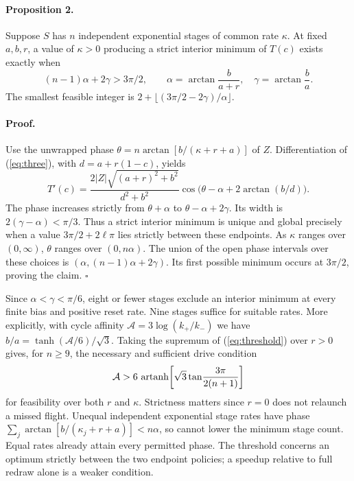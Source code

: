 \documentclass[11pt]{article}
\begin{document}
\paragraph{Proposition 2.}
Suppose $S$ has $n$ independent exponential stages of common rate $\kappa$. At fixed $a,b,r$, a value of $\kappa>0$ producing a strict interior minimum of $T(c)$ exists exactly when
\begin{equation}
 (n-1)\alpha+2\gamma>3\pi/2,\qquad
 \alpha=\arctan\!\frac{b}{a+r},\quad \gamma=\arctan\!\frac{b}{a}. \label{eq:threshold}
\end{equation}
The smallest feasible integer is $2+\lfloor(3\pi/2-2\gamma)/\alpha\rfloor$.

\paragraph{Proof.}
Use the unwrapped phase $\theta=n\arctan[b/(\kappa+r+a)]$ of $Z$. Differentiation of (\ref{eq:three}), with $d=a+r(1-c)$, yields
\[
 T'(c)=\frac{2|Z|\sqrt{(a+r)^2+b^2}}{d^2+b^2}
 \cos\bigl(\theta-\alpha+2\arctan(b/d)\bigr).
\]
The phase increases strictly from $\theta+\alpha$ to $\theta-\alpha+2\gamma$. Its width is $2(\gamma-\alpha)<\pi/3$. Thus a strict interior minimum is unique and global precisely when a value $3\pi/2+2\ell\pi$ lies strictly between these endpoints. As $\kappa$ ranges over $(0,\infty)$, $\theta$ ranges over $(0,n\alpha)$. The union of the open phase intervals over these choices is $(\alpha,(n-1)\alpha+2\gamma)$. Its first possible minimum occurs at $3\pi/2$, proving the claim. \hfill$\square$

Since $\alpha<\gamma<\pi/6$, eight or fewer stages exclude an interior minimum at every finite bias and positive reset rate. Nine stages suffice for suitable rates. More explicitly, with cycle affinity $\mathcal A=3\log(k_+/k_-)$ we have $b/a=\tanh(\mathcal A/6)/\sqrt3$. Taking the supremum of (\ref{eq:threshold}) over $r>0$ gives, for $n\ge9$, the necessary and sufficient drive condition
\[
 \mathcal A>6\,\mathop{\rm artanh}\!\left[\sqrt3
             \tan\!\frac{3\pi}{2(n+1)}\right]
\]
for feasibility over both $r$ and $\kappa$. Strictness matters since $r=0$ does not relaunch a missed flight. Unequal independent exponential stage rates have phase $\sum_j\arctan[b/(\kappa_j+r+a)]<n\alpha$, so cannot lower the minimum stage count. Equal rates already attain every permitted phase. The threshold concerns an optimum strictly between the two endpoint policies; a speedup relative to full redraw alone is a weaker condition.
\end{document}
